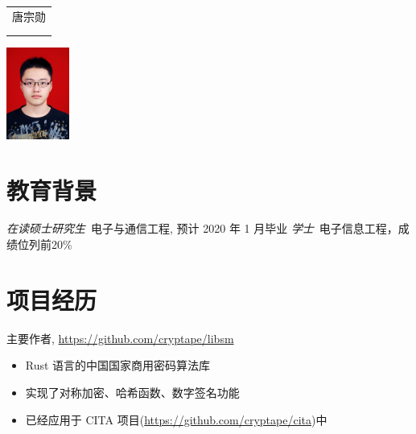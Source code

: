 \documentclass{resume}
\newcommand{\hlink}[1]{\href{#1}{#1}}
\begin{document}

\medskip\noindent
\begin{minipage}{0.7\textwidth}
  \Large{
    \begin{tabu}  { l }
      \scshape{唐宗勋} \\
       \\
       \\
    \end{tabu}
  }
\end{minipage}
\begin{minipage}{0.3\textwidth}
  \raggedleft
  \includegraphics[height=30mm]{me}
\end{minipage}

%


\section{教育背景}
\textit{在读硕士研究生}\ 电子与通信工程, 预计 2020 年 1 月毕业
\textit{学士}\ 电子信息工程，成绩位列前20\%

\section{项目经历}
主要作者, \hlink{https://github.com/cryptape/libsm}
\begin{itemize}
  \item Rust 语言的中国国家商用密码算法库
  \item 实现了对称加密、哈希函数、数字签名功能
  \item 已经应用于 CITA 项目(\hlink{https://github.com/cryptape/cita})中
\end{itemize}
\end{document}
